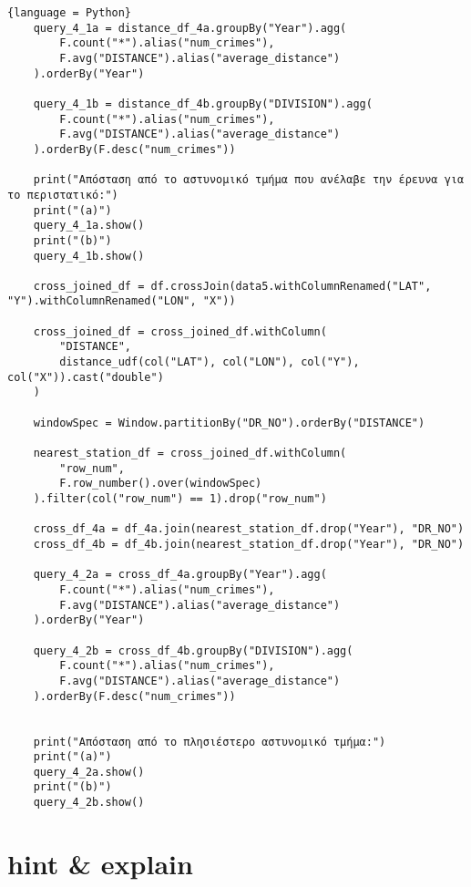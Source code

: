 \documentclass{article}
\begin{document}
\begin{lstlisting}{language = Python}
    query_4_1a = distance_df_4a.groupBy("Year").agg(
        F.count("*").alias("num_crimes"),
        F.avg("DISTANCE").alias("average_distance")
    ).orderBy("Year")

    query_4_1b = distance_df_4b.groupBy("DIVISION").agg(
        F.count("*").alias("num_crimes"),
        F.avg("DISTANCE").alias("average_distance")
    ).orderBy(F.desc("num_crimes"))

    print("Απόσταση από το αστυνομικό τμήμα που ανέλαβε την έρευνα για το περιστατικό:")
    print("(a)")
    query_4_1a.show() 
    print("(b)")
    query_4_1b.show() 

    cross_joined_df = df.crossJoin(data5.withColumnRenamed("LAT", "Y").withColumnRenamed("LON", "X"))

    cross_joined_df = cross_joined_df.withColumn(
        "DISTANCE",
        distance_udf(col("LAT"), col("LON"), col("Y"), col("X")).cast("double")
    )

    windowSpec = Window.partitionBy("DR_NO").orderBy("DISTANCE")

    nearest_station_df = cross_joined_df.withColumn(
        "row_num",
        F.row_number().over(windowSpec)
    ).filter(col("row_num") == 1).drop("row_num")

    cross_df_4a = df_4a.join(nearest_station_df.drop("Year"), "DR_NO")
    cross_df_4b = df_4b.join(nearest_station_df.drop("Year"), "DR_NO")

    query_4_2a = cross_df_4a.groupBy("Year").agg(
        F.count("*").alias("num_crimes"),
        F.avg("DISTANCE").alias("average_distance")
    ).orderBy("Year")

    query_4_2b = cross_df_4b.groupBy("DIVISION").agg(
        F.count("*").alias("num_crimes"),
        F.avg("DISTANCE").alias("average_distance")
    ).orderBy(F.desc("num_crimes"))


    print("Απόσταση από το πλησιέστερο αστυνομικό τμήμα:")
    print("(a)")
    query_4_2a.show()
    print("(b)")
    query_4_2b.show()
\end{lstlisting}


\section{hint \& explain}

\
\end{document}
